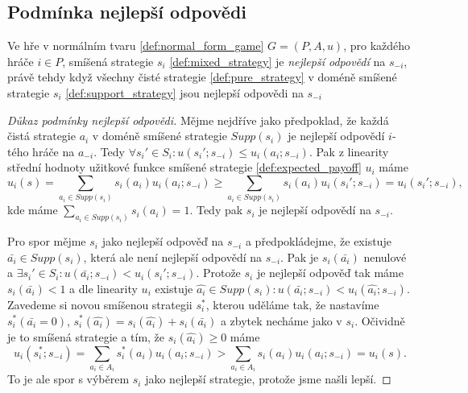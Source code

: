 \subsection{Podmínka nejlepší odpovědi}
\begin{theorem}
\label{thm:best_response}
Ve hře v normálním tvaru \ref{def:normal_form_game} $G = (P, A, u)$, pro každého hráče $i \in P$, smíšená strategie $s_i$ \ref{def:mixed_strategy} je \textit{nejlepší odpovědí} na $s_{-i}$, právě tehdy když všechny čisté strategie \ref{def:pure_strategy} v doméně smíšené strategie $s_i$ \ref{def:support_strategy} jsou nejlepší odpovědi na $s_{-i}$ 
\end{theorem}
\begin{proof}[Důkaz podmínky nejlepší odpovědi]
    Mějme nejdříve jako předpoklad, že každá čistá strategie $a_i$ v doméně smíšené strategie $Supp(s_i)$ je nejlepší odpovědí $i$-tého hráče na $a_{-i}$. 
    Tedy $\forall s_i' \in S_i: u(s_i'; s_{-i}) \leq u_i(a_i;s_{-i})$. 
    Pak z linearity střední hodnoty užitkové funkce smíšené strategie \ref{def:expected_payoff} $u_i$ máme 
    $$
    u_i(s) = \sum_{a_i \in Supp(s_i)} s_i(a_i) u_i(a_i; s_{-i}) \geq  \sum_{a_i \in Supp(s_i)} s_i(a_i) u_i(s_i'; s_{-i}) = u_i(s_i'; s_{-i})\text{,}
    $$
    kde máme $\sum_{a_i \in Supp(s_i)} s_i(a_i) = 1$. Tedy pak $s_i$ je nejlepší odpovědí na $s_{-i}$. 

    Pro spor mějme $s_i$ jako nejlepší odpověď na $s_{-i}$ a předpokládejme, že existuje $\bar{a_i} \in Supp(s_i)$, která ale není nejlepší odpovědí na $s_{-i}$. 
    Pak je $s_i(\bar{a_i})$ nenulové a $\exists s_i' \in S_i: u(\bar{a_i}; s_{-i}) < u_i(s_i';s_{-i})$. 
    Protože $s_i$ je nejlepší odpověď tak máme $s_i(\bar{a_i}) < 1$ a dle linearity $u_i$ existuje $\hat{a_i} \in Supp(s_i): u(\bar{a_i}; s_{-i}) < u_i(\hat{a_i};s_{-i})$. 
    Zavedeme si novou smíšenou strategii $s^*_i$, kterou uděláme tak, že nastavíme $s_i^*(\bar{a_i} = 0)$, $s_i^*(\hat{a_i}) = s_i(\hat{a_i}) + s_i(\bar{a_i})$ a zbytek necháme jako v $s_i$. 
    Očividně je to smíšená strategie a tím, že $s_i(\hat{a_i}) \geq 0$ máme 
    $$
    u_i(s^*_i; s_{-i}) = \sum_{a_i \in A_i} s^*_i(a_i) u_i(a_i; s_{-i}) > \sum_{a_i \in A_i} s_i(a_i) u_i(a_i; s_{-i}) = u_i(s)\text{.} 
    $$
    To je ale spor s výběrem $s_i$ jako nejlepší strategie, protože jsme našli lepší. 
\end{proof}
